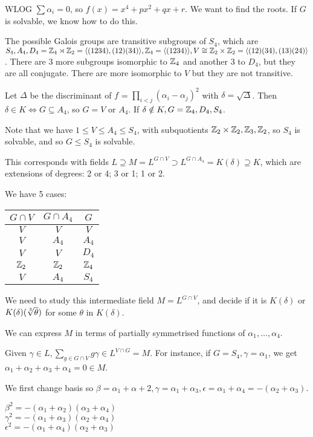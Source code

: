 \documentclass[10pt,a4paper]{article}
\begin{document}
WLOG $\sum \alpha_i = 0$, so $f(x) = x^4 + px^2+ qx+r$. We want to find the roots. If $G$ is solvable, we know how to do this.

The possible Galois groups are transitive subgroups of $S_4$, which are $S_4, A_4, D_4 = \mathbb{Z}_4 \rtimes \mathbb{Z}_2 = \langle (1234),(12)(34) \rangle, \mathbb{Z}_4 = \langle (1234) \rangle, V \cong \mathbb{Z}_2 \times \mathbb{Z}_2 = \langle (12)(34), (13)(24) \rangle$. There are $3$ more subgroups isomorphic to $\mathbb{Z}_4$ and another $3$ to $D_4$, but they are all conjugate. There are more isomorphic to $V$ but they are not transitive.

Let $\Delta$ be the discriminant of $f$ = $\prod_{i<j} (\alpha_i-\alpha_j)^2$ with $\delta = \sqrt{\Delta}$. Then $\delta \in K \iff G \subseteq A_4$, so $G = V$ or $A_4$. If $\delta \notin K, G = \mathbb{Z}_4, D_4, S_4$.

Note that we have $1 \leq V \leq A_4 \leq S_4$, with subquotients $\mathbb{Z}_2 \times \mathbb{Z}_2, \mathbb{Z}_3, \mathbb{Z}_2$, so $S_4$ is solvable, and so $G \leq S_4$ is solvable. 

This corresponds with fields $L \supseteq M = L^{G \cap  V} \supset L^{G \cap A_4} = K(\delta) \supseteq K$, which are extensions of degrees: 2 or 4; 3 or 1; 1 or 2.

We have 5 cases:
\begin{tabular}{c|c|c}
$G\cap V$ & $G \cap A_4$ & $G$ \\\hline
$V$&$V$&$V$\\
$V$&$A_4$&$A_4$\\
$V$&$V$&$D_4$\\
$\mathbb{Z}_2$&$\mathbb{Z}_2$&$\mathbb{Z}_4$\\
$V$&$A_4$&$S_4$
\end{tabular}

We need to study this intermediate field $M = L^{G \cap V}$, and decide if it is $K(\delta)$ or $K(\delta)(\sqrt[3]{\theta})$ for some $\theta$ in $K(\delta)$.

We can express $M$ in terms of partially symmetrised functions of $\alpha_1, \ldots, \alpha_4$.

Given $\gamma \in L, \sum_{g \in G \cap V} g\gamma \in L^{V \cap G} = M$. For instance, if $G = S_4, \gamma= \alpha_1$, we get $\alpha_1+\alpha_2+\alpha_3+\alpha_4 = 0 \in M$.

We first change basis so $\beta = \alpha_1+\alpha+2, \gamma = \alpha_1+\alpha_3, \epsilon = \alpha_1+ \alpha_4 = -(\alpha_2+\alpha_3)$.

$\beta^2 = -(\alpha_1+\alpha_2)(\alpha_3+\alpha_4)$\\
$\gamma^2 = -(\alpha_1+\alpha_3)(\alpha_2+\alpha_4)$\\
$\epsilon^2 = -(\alpha_1+\alpha_4)(\alpha_2+\alpha_3)$
\end{document}
